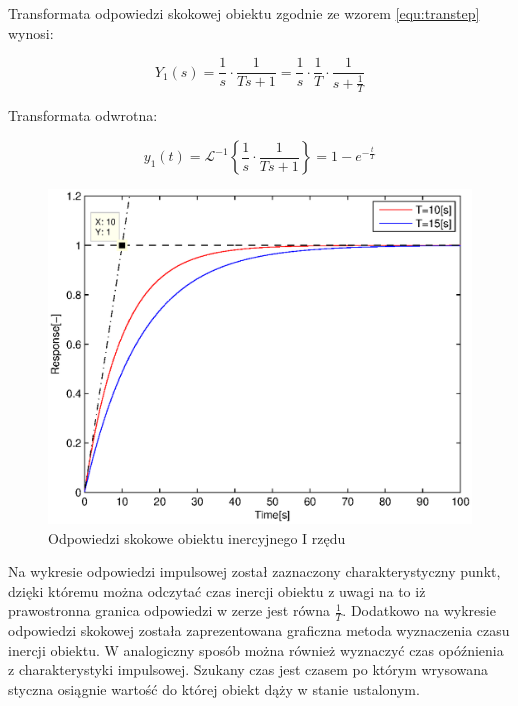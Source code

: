 \documentclass[12pt]{article}
\begin{document}
\newpage

Transformata odpowiedzi skokowej obiektu zgodnie ze wzorem \eqref{equ:transtep}
wynosi:

\begin{equation*}
	Y_{1}(s)=\frac{1}{s}\cdot \frac{1}{Ts+1}=\frac{1}{s}\cdot \frac{1}{T}\cdot
	\frac{1}{s+\frac{1}{T}}
\end{equation*}

Transformata odwrotna:

\begin{equation*}
	y_{1}(t)=\mathcal{L}^{-1}\left\{\frac{1}{s}\cdot \frac{1}{Ts+1}\right\} =
	1-e^{-\frac{t}{T}}
\end{equation*}

\begin{figure}[!htb]
	\begin{center}
		\includegraphics[width=14cm]{../res/img/step1.eps}
	\end{center}
	\caption{Odpowiedzi skokowe obiektu inercyjnego I rzędu}
\end{figure}

Na wykresie odpowiedzi impulsowej został zaznaczony charakterystyczny punkt,
dzięki któremu można odczytać czas inercji obiektu z uwagi na to iż
prawostronna granica odpowiedzi w zerze jest równa $\frac{1}{T}$. Dodatkowo na
wykresie odpowiedzi skokowej została zaprezentowana graficzna metoda wyznaczenia
czasu inercji obiektu. W analogiczny sposób można również wyznaczyć czas
opóźnienia z charakterystyki impulsowej. Szukany czas jest czasem po którym
wrysowana styczna osiągnie wartość do której obiekt dąży w stanie ustalonym.
\end{document}
